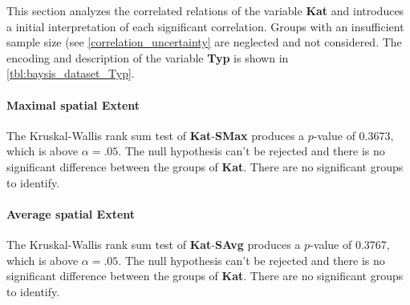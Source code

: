 This section analyzes the correlated relations of the variable \textbf{Kat} and introduces a initial interpretation of each significant correlation. Groups with an insufficient sample size (see \cref{correlation_uncertainty} are neglected and not considered. The encoding and description of the variable \textbf{Typ} is shown in \cref{tbl:baysis_dataset_Typ}.
\paragraph{Maximal spatial Extent}
The Kruskal-Wallis rank sum test of \textbf{Kat}-\textbf{SMax} produces a $p$-value of 0.3673, which is above $\alpha=.05$. The null hypothesis can't be rejected and there is no significant difference between the groups of \textbf{Kat}. There are no significant groups to identify.

\paragraph{Average spatial Extent}
The Kruskal-Wallis rank sum test of \textbf{Kat}-\textbf{SAvg} produces a $p$-value of 0.3767, which is above $\alpha=.05$. The null hypothesis can't be rejected and there is no significant difference between the groups of \textbf{Kat}. There are no significant groups to identify.

